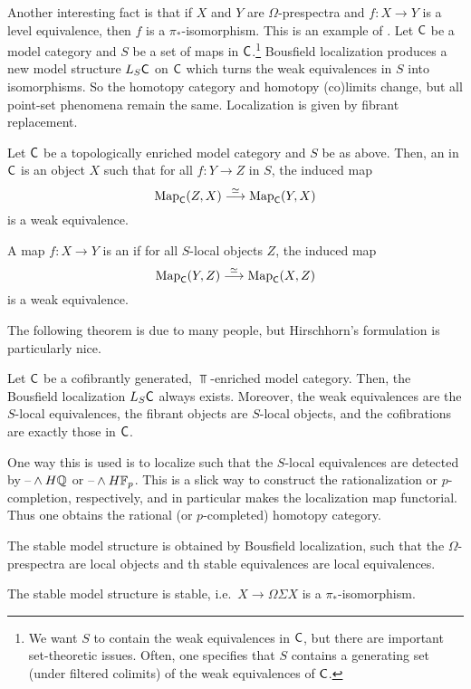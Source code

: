 Another interesting fact is that if $X$ and $Y$ are $\Omega$-prespectra and $f\colon X\to Y$ is a level
equivalence, then $f$ is a $\pi_*$-isomorphism. This is an example of . Let $\mathsf C$ be a
model category and $S$ be a set of maps in $\mathsf C$.\footnote{We want $S$ to contain the weak equivalences in $\mathsf C$,
but there are important set-theoretic issues. Often, one specifies that $S$ contains a generating set (under
filtered colimits) of the weak equivalences of $\mathsf C$.} Bousfield localization produces a new model structure
$L_S\mathsf C$ on $\mathsf C$ which turns the weak equivalences in $S$ into isomorphisms. So the homotopy category and homotopy
(co)limits change, but all point-set phenomena remain the same. Localization is given by fibrant replacement.
\begin{defn}
Let $\mathsf C$ be a topologically enriched model category and $S$ be as above. Then, an  in $\mathsf C$
is an object $X$ such that for all $f\colon Y\to Z$ in $S$, the induced map
\[\operatorname{Map}_\mathsf C(Z,X)\stackrel\simeq\longrightarrow \operatorname{Map}_\mathsf C(Y, X)\]
is a weak equivalence.

A map $f\colon X\to Y$ is an  if for all $S$-local objects $Z$, the induced map
\[\operatorname{Map}_\mathsf C(Y,Z)\stackrel\simeq\longrightarrow \operatorname{Map}_\mathsf C(X,Z)\]
is a weak equivalence.
\end{defn}
The following theorem is due to many people, but Hirschhorn's formulation is particularly nice.
\begin{thm}[Hirschhorn]
Let $\mathsf C$ be a cofibrantly generated, $\Top$-enriched model category. Then, the Bousfield localization $L_S\mathsf C$
always exists. Moreover, the weak equivalences are the $S$-local equivalences, the fibrant objects are $S$-local
objects, and the cofibrations are exactly those in $\mathsf C$.
\end{thm}
\begin{exm}
One way this is used is to localize such that the $S$-local equivalences are detected by $\text{--}\wedge H\mathbb Q$ or
$\text{--}\wedge H\mathbb F_p$. This is a slick way to construct the rationalization or $p$-completion, respectively, and in
particular makes the localization map functorial. Thus one obtains the rational (or $p$-completed) homotopy
category.
\end{exm}
The stable model structure is obtained by Bousfield localization, such that the $\Omega$-prespectra are local
objects and th stable equivalences are local equivalences.
\begin{prop}
The stable model structure is stable, i.e.\ $X\to\Omega\Sigma X$ is a $\pi_*$-isomorphism.
\end{prop}
